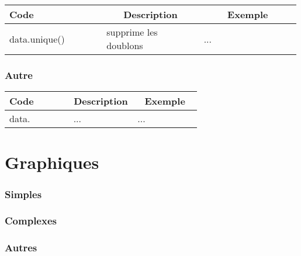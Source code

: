 \documentclass{article}
\begin{document}
	\begin{center}
    \begin{tabular}{|p{0.33\linewidth}|p{0.33\linewidth}|p{0.33\linewidth}|}
	\hline
	\multicolumn{1}{|l|}{Code} &
	\multicolumn{1}{c|}{Description} &
	\multicolumn{1}{c|}{Exemple} \\ \hline
	data.unique() & supprime les doublons & ...  \\
	\hline
	\end{tabular}
    \end{center}
    
    \section*{Autre}
    
    \begin{center}
    \begin{tabular}{|p{0.33\linewidth}|p{0.33\linewidth}|p{0.33\linewidth}|}
	\hline
	\multicolumn{1}{|l|}{Code} &
	\multicolumn{1}{c|}{Description} &
	\multicolumn{1}{c|}{Exemple} \\ \hline
	data. & ... & ...  \\
	\hline
	\end{tabular}
    \end{center}
    
    \part*{Graphiques}
    
     \section*{Simples}
     \section*{Complexes}
     \section*{Autres}
\end{document}
